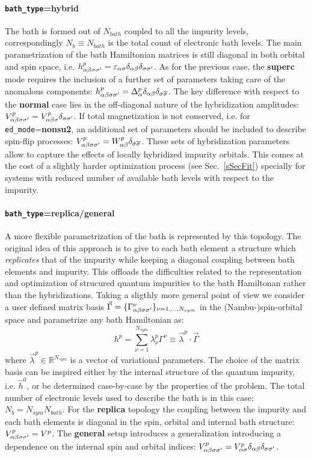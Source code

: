 \documentclass[final,3p,10pt]{elsarticle}
\newcommand{\secu}[1]
{Sec.~\ref{#1}}
\def\a{\alpha}       \def\b{\beta}   \def\g{\gamma}   \def\d{\delta}
\def\RRR{\mathbb{R}} \def\CCC{\mathbb{C}} \def\NNN{\mathbb{N}}
\begin{document}
\paragraph{{\tt bath\_type}={\bf hybrid}} The bath is formed out of
$N_{bath}$ coupled to all the impurity levels, correspondingly
$N_b\equiv N_{bath}$ is the total count of electronic bath levels. 
The main parametrization of the bath Hamiltonian matrices is still
diagonal in both orbital and spin space, i.e.
$h^p_{\a\b\s\s'}=\varepsilon_{\a\s}\delta_{\a\b}\delta_{\s\s'}$.
As for the previous case, the {\bf superc} mode requires the inclusion
of a further set of parameters taking care of the anomalous components:
$h^p_{\a\b\s\s'}=\Delta^p_{\a}\delta_{\a\b}\delta_{\s
  \overline{\s}}$.
The key difference with respect to the {\bf normal} case lies in the
off-diagonal nature of the hybridization amplitudes:
$V^p_{\a\b\s\s'}=V^p_{\a\b\s}\delta_{\s\s'}$. If total magnetization
is not conserved, i.e. for {\tt ed\_mode}={\bf nonsu2}, an additional
set of parameters should be included to describe spin-flip processes:
$V^p_{\a\b\s\s'} = W^p_{\a\b}\delta_{\s \overline{\s}}$. 
These sets of hybridization parameters allow to capture the effects of locally
hybridized impurity orbitals. This comes at the cost of a
slightly harder optimization process (see \secu{sSecFit}) specially
for systems with reduced number of available bath levels with respect
to the impurity. 

\paragraph{{\tt bath\_type}={\bf replica}/{\bf general}} A more flexible
parametrization of the bath is represented by this topology. The
original idea of this approach is to give to each bath element a structure which {\it replicates}
that of the impurity while keeping a diagonal coupling between bath
elements and impurity. This offloads the difficulties related to the
representation and optimization of strucured quantum impurities to the
bath Hamiltonan rather than the hybridizations.
Taking a sligthly more general point of view we consider a user
defined matrix basis $\vec{\Gamma}=\{ \Gamma^\nu_{\a\b\s\s'} \}_{\nu=1,\dots,N_{sym}}$ in the (Nambu-)spin-orbital
space and parametrize any bath Hamiltonian as:
$$
h^p = \sum_{\nu=1}^{N_{sym}} \lambda^p_\nu
\Gamma^\nu\equiv \vec{\lambda}^p\cdot \vec{\Gamma}
$$
where $\vec{\lambda}^p\in\RRR^{N_{sym}}$ is a vector of variational parameters. 
The choice of the matrix basis can be inspired either by the internal structure
of the quantum impurity, i.e. $\hat{h}^0$, or be determined
case-by-case by the properties of the problem.
The total number of electronic levels used to describe the bath is in
this case: $N_b = N_{sym} N_{bath}$. 
For the {\bf replica}  topology the coupling between the impurity and
each bath elements is diagonal in the spin, orbital and internal bath
structure: $V^p_{\a\b\s\s'} = V^p$. The
{\bf general} setup introduces a generalization introducing a
dependence on the internal spin and orbital indices: $V^p_{\a\b\s\s'}
= V^p_{\a\s}\delta_{\a\b}\delta_{\s\s'}$. 
\end{document}
